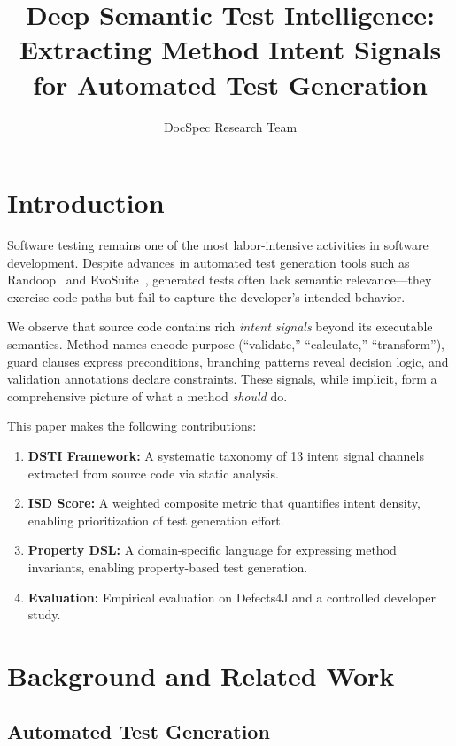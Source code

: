 \documentclass[sigconf,nonacm]{acmart}
\title{Deep Semantic Test Intelligence: Extracting Method Intent Signals for Automated Test Generation}
\author{DocSpec Research Team}
\affiliation{%
  \institution{DocSpec Project}
}
\begin{document}
\maketitle

\section{Introduction}

Software testing remains one of the most labor-intensive activities in
software development. Despite advances in automated test generation tools
such as Randoop~\cite{pacheco2007randoop} and EvoSuite~\cite{fraser2011evosuite},
generated tests often lack semantic relevance---they exercise code paths
but fail to capture the developer's intended behavior.

We observe that source code contains rich \emph{intent signals} beyond
its executable semantics. Method names encode purpose (``validate,''
``calculate,'' ``transform''), guard clauses express preconditions,
branching patterns reveal decision logic, and validation annotations
declare constraints. These signals, while implicit, form a comprehensive
picture of what a method \emph{should} do.

This paper makes the following contributions:
\begin{enumerate}
  \item \textbf{DSTI Framework:} A systematic taxonomy of 13 intent signal
    channels extracted from source code via static analysis.
  \item \textbf{ISD Score:} A weighted composite metric that quantifies
    intent density, enabling prioritization of test generation effort.
  \item \textbf{Property DSL:} A domain-specific language for expressing
    method invariants, enabling property-based test generation.
  \item \textbf{Evaluation:} Empirical evaluation on Defects4J and a
    controlled developer study.
\end{enumerate}

\section{Background and Related Work}

\subsection{Automated Test Generation}
\end{document}

